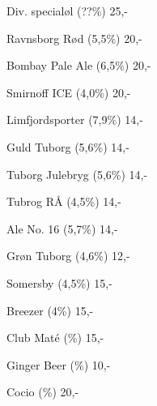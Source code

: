 \documentclass{article}
\begin{document}

\maketitle

\null
\vspace{-0.8cm}


\vspace{0.3cm}

Div. specialøl {\large (??\%)}  \hfill 25,-

\vspace{0.3cm}

Ravnsborg Rød {\large (5,5\%)}  \hfill 20,-

\vspace{0.3cm}

Bombay Pale Ale {\large (6,5\%)}  \hfill 20,-

\vspace{0.3cm}

Smirnoff ICE {\large (4,0\%)}  \hfill 20,-

\vspace{1.3cm}

Limfjordsporter {\large (7,9\%)}  \hfill 14,-





\vspace{1.3cm}

Guld Tuborg {\large (5,6\%)} \hfill 14,-

\vspace{0.3cm}

Tuborg Julebryg {\large (5,6\%)} \hfill 14,-

\vspace{0.3cm}

Tubrog RÅ {\large (4,5\%)} \hfill 14,-

\vspace{0.3cm}

Ale No. 16 {\large (5,7\%)} \hfill 14,-

\vspace{0.3cm}

Grøn Tuborg {\large (4,6\%)} \hfill 12,-

\vspace{0.3cm}

Somersby {\large (4,5\%)} \hfill 15,-

\vspace{0.3cm}

Breezer {\large (4\%)} \hfill 15,-

\vspace{1.3cm}

Club Maté {\large (\frownie{}\%)} \hfill 15,-

\vspace{0.3cm}

Ginger Beer {\large (\frownie{}\%)} \hfill 10,-

\vspace{0.3cm}

Cocio {\large (\frownie{}\%)}  \hfill 20,-

\underskriv
\end{document}
